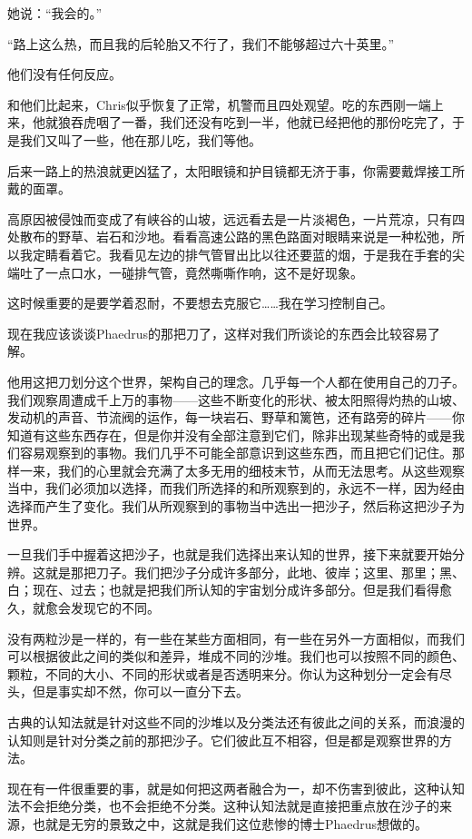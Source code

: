 \documentclass[UTF8]{article}
\begin{document}
\par 她说：“我会的。”
\par “路上这么热，而且我的后轮胎又不行了，我们不能够超过六十英里。”
\par 他们没有任何反应。
\par 和他们比起来，Chris似乎恢复了正常，机警而且四处观望。吃的东西刚一端上来，他就狼吞虎咽了一番，我们还没有吃到一半，他就已经把他的那份吃完了，于是我们又叫了一些，他在那儿吃，我们等他。
\par 后来一路上的热浪就更凶猛了，太阳眼镜和护目镜都无济于事，你需要戴焊接工所戴的面罩。
\par 高原因被侵蚀而变成了有峡谷的山坡，远远看去是一片淡褐色，一片荒凉，只有四处散布的野草、岩石和沙地。看看高速公路的黑色路面对眼睛来说是一种松弛，所以我定睛看着它。我看见左边的排气管冒出比以往还要蓝的烟，于是我在手套的尖端吐了一点口水，一碰排气管，竟然嘶嘶作响，这不是好现象。
\par 这时候重要的是要学着忍耐，不要想去克服它……我在学习控制自己。
\par 现在我应该谈谈Phaedrus的那把刀了，这样对我们所谈论的东西会比较容易了解。
\par 他用这把刀划分这个世界，架构自己的理念。几乎每一个人都在使用自己的刀子。我们观察周遭成千上万的事物——这些不断变化的形状、被太阳照得灼热的山坡、发动机的声音、节流阀的运作，每一块岩石、野草和篱笆，还有路旁的碎片——你知道有这些东西存在，但是你并没有全部注意到它们，除非出现某些奇特的或是我们容易观察到的事物。我们几乎不可能全部意识到这些东西，而且把它们记住。那样一来，我们的心里就会充满了太多无用的细枝末节，从而无法思考。从这些观察当中，我们必须加以选择，而我们所选择的和所观察到的，永远不一样，因为经由选择而产生了变化。我们从所观察到的事物当中选出一把沙子，然后称这把沙子为世界。
\par 一旦我们手中握着这把沙子，也就是我们选择出来认知的世界，接下来就要开始分辨。这就是那把刀子。我们把沙子分成许多部分，此地、彼岸；这里、那里；黑、白；现在、过去；也就是把我们所认知的宇宙划分成许多部分。但是我们看得愈久，就愈会发现它的不同。
\par 没有两粒沙是一样的，有一些在某些方面相同，有一些在另外一方面相似，而我们可以根据彼此之间的类似和差异，堆成不同的沙堆。我们也可以按照不同的颜色、颗粒，不同的大小、不同的形状或者是否透明来分。你认为这种划分一定会有尽头，但是事实却不然，你可以一直分下去。
\par 古典的认知法就是针对这些不同的沙堆以及分类法还有彼此之间的关系，而浪漫的认知则是针对分类之前的那把沙子。它们彼此互不相容，但是都是观察世界的方法。
\par 现在有一件很重要的事，就是如何把这两者融合为一，却不伤害到彼此，这种认知法不会拒绝分类，也不会拒绝不分类。这种认知法就是直接把重点放在沙子的来源，也就是无穷的景致之中，这就是我们这位悲惨的博士Phaedrus想做的。
\end{document}
